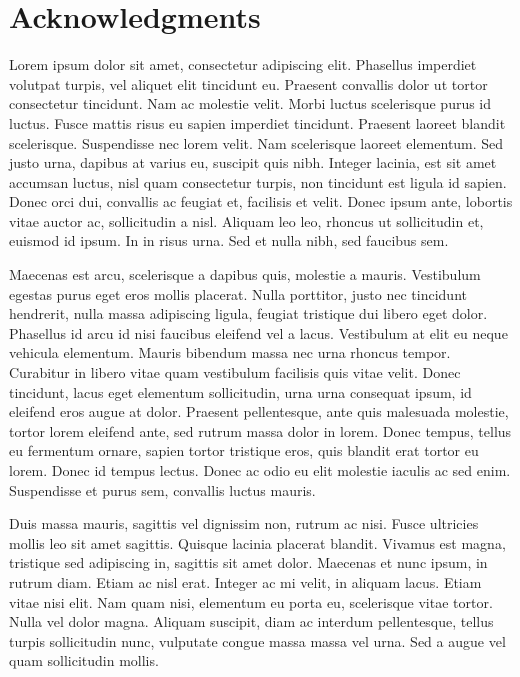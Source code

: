 \section*{Acknowledgments}

Lorem ipsum dolor sit amet, consectetur adipiscing elit. Phasellus imperdiet volutpat turpis, vel aliquet elit tincidunt eu. Praesent convallis dolor ut tortor consectetur tincidunt. Nam ac molestie velit. Morbi luctus scelerisque purus id luctus. Fusce mattis risus eu sapien imperdiet tincidunt. Praesent laoreet blandit scelerisque. Suspendisse nec lorem velit. Nam scelerisque laoreet elementum. Sed justo urna, dapibus at varius eu, suscipit quis nibh. Integer lacinia, est sit amet accumsan luctus, nisl quam consectetur turpis, non tincidunt est ligula id sapien. Donec orci dui, convallis ac feugiat et, facilisis et velit. Donec ipsum ante, lobortis vitae auctor ac, sollicitudin a nisl. Aliquam leo leo, rhoncus ut sollicitudin et, euismod id ipsum. In in risus urna. Sed et nulla nibh, sed faucibus sem.

Maecenas est arcu, scelerisque a dapibus quis, molestie a mauris. Vestibulum egestas purus eget eros mollis placerat. Nulla porttitor, justo nec tincidunt hendrerit, nulla massa adipiscing ligula, feugiat tristique dui libero eget dolor. Phasellus id arcu id nisi faucibus eleifend vel a lacus. Vestibulum at elit eu neque vehicula elementum. Mauris bibendum massa nec urna rhoncus tempor. Curabitur in libero vitae quam vestibulum facilisis quis vitae velit. Donec tincidunt, lacus eget elementum sollicitudin, urna urna consequat ipsum, id eleifend eros augue at dolor. Praesent pellentesque, ante quis malesuada molestie, tortor lorem eleifend ante, sed rutrum massa dolor in lorem. Donec tempus, tellus eu fermentum ornare, sapien tortor tristique eros, quis blandit erat tortor eu lorem. Donec id tempus lectus. Donec ac odio eu elit molestie iaculis ac sed enim. Suspendisse et purus sem, convallis luctus mauris.

Duis massa mauris, sagittis vel dignissim non, rutrum ac nisi. Fusce ultricies mollis leo sit amet sagittis. Quisque lacinia placerat blandit. Vivamus est magna, tristique sed adipiscing in, sagittis sit amet dolor. Maecenas et nunc ipsum, in rutrum diam. Etiam ac nisl erat. Integer ac mi velit, in aliquam lacus. Etiam vitae nisi elit. Nam quam nisi, elementum eu porta eu, scelerisque vitae tortor. Nulla vel dolor magna. Aliquam suscipit, diam ac interdum pellentesque, tellus turpis sollicitudin nunc, vulputate congue massa massa vel urna. Sed a augue vel quam sollicitudin mollis.

